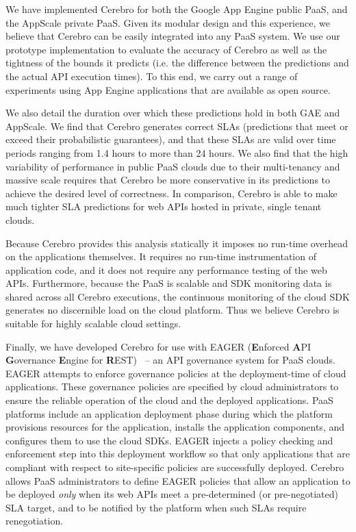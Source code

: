 We have implemented Cerebro for both the Google App Engine public PaaS, and 
the AppScale private PaaS. Given its modular design and this experience, 
we believe that Cerebro can be easily integrated into any PaaS system.
We use our prototype implementation to evaluate the accuracy of Cerebro 
as well as the tightness
of the bounds it predicts (i.e. the difference between the predictions and 
the actual API execution times). To this end, we carry out a range of experiments
 using App Engine applications that are available as open source.  

We also detail the duration over which 
these predictions hold in both GAE and AppScale.  
We find that Cerebro generates correct SLAs (predictions that meet or exceed their
probabilistic guarantees), and that these SLAs are valid over time periods ranging
from 1.4 hours to more than 24 hours.  
We also find that the high variability of performance in public PaaS clouds due to their multi-tenancy
and massive scale requires that Cerebro be more conservative in its predictions 
to achieve the desired level of correctness. In comparison, Cerebro is able to make
much tighter SLA predictions for web APIs hosted in private, single tenant clouds.

Because Cerebro provides this 
analysis statically it imposes no run-time overhead on the applications
themselves. It requires no run-time instrumentation of application code,
and it does not require any performance testing of the web APIs.
Furthermore, because the PaaS is scalable and SDK monitoring data is 
shared across all Cerebro executions, the continuous monitoring of the
cloud SDK generates no discernible load on the cloud platform.
Thus we believe Cerebro is suitable for highly scalable cloud
settings.

Finally, we have developed Cerebro for use with EAGER (\textbf{E}nforced
\textbf{A}PI \textbf{G}overnance \textbf{E}ngine for
\textbf{R}EST)~\cite{eager-fop15} --
an API governance system for PaaS clouds. EAGER attempts to enforce
governance policies at the deployment-time of cloud applications. These governance
policies are specified by cloud administrators to ensure the reliable
operation of the cloud and the deployed applications. PaaS
platforms include an application deployment phase during which the platform provisions
resources for the application, installs the application components, and
configures them to use the cloud SDKs. EAGER injects a policy checking and
enforcement step into this deployment workflow so that only applications that
are compliant with respect to site-specific policies are successfully deployed. 
Cerebro allows
PaaS administrators to define
EAGER policies that allow an application to be deployed \textit{only} when its
web APIs meet a pre-determined (or pre-negotiated) SLA target, and to be
notified by the platform when such SLAs require renegotiation.

